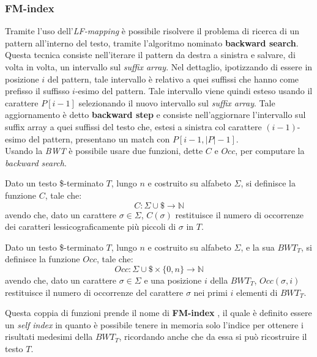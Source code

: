 \subsubsection{FM-index}
Tramite l'uso dell'\textit{LF-mapping} è possibile risolvere il problema di
ricerca di un pattern all'interno del testo, tramite l'algoritmo nominato
\textbf{backward search}. Questa tecnica consiste nell'iterare il pattern da
destra a sinistra e
salvare, di volta in volta, un intervallo sul \textit{suffix array}. Nel
dettaglio, ipotizzando di essere in posizione $i$ del pattern, tale
intervallo è relativo a quei suffissi che hanno come prefisso il suffisso
$i$-esimo del pattern. Tale intervallo viene quindi esteso usando il carattere
$P[i-1]$ selezionando il nuovo intervallo sul \textit{suffix array}. Tale
aggiornamento è detto \textbf{backward step} e consiste nell'aggiornare
l'intervallo sul suffix array a quei suffissi del testo che, estesi a sinistra
col carattere $(i-1)$-esimo del pattern, presentano un match con $P[i-1,
|P|-1]$.\\  
Usando la \textit{BWT} è possibile usare due funzioni, dette $C$ e $Occ$, per
computare la \textit{backward search}.
\begin{definizione}
  Dato un testo \$-terminato $T$, lungo $n$ e costruito su alfabeto $\Sigma$, si
  definisce la funzione $C$, tale che:
  \[C:\Sigma\cup \$\to \mathbb{N}\]
  avendo che, dato un carattere $\sigma\in\Sigma$, $C(\sigma)$ restituisce il
  numero di 
  occorrenze dei caratteri lessicograficamente più piccoli di $\sigma$ in $T$.
\end{definizione}
\begin{definizione}
  Dato un testo \$-terminato $T$, lungo $n$ e costruito su alfabeto $\Sigma$, e
  la sua $BWT_T$, si definisce la funzione $Occ$, tale che:
  \[Occ:\Sigma\cup \$\times \{0,n\}\to \mathbb{N}\]
  avendo che, dato un carattere $\sigma\in\Sigma$ e una posizione $i$ della
  $BWT_T$, $Occ(\sigma,i)$ restituisce il numero di occorrenze del carattere
  $\sigma$ nei primi $i$ elementi di $BWT_T$.
\end{definizione}
Questa coppia di funzioni prende il nome di \textbf{FM-index} \cite{fm}, il
quale è definito essere un \textit{self index} in quanto è possibile tenere in
memoria solo l'indice per ottenere i risultati medesimi della $BWT_T$,
ricordando anche che da essa si può ricostruire il testo $T$.
